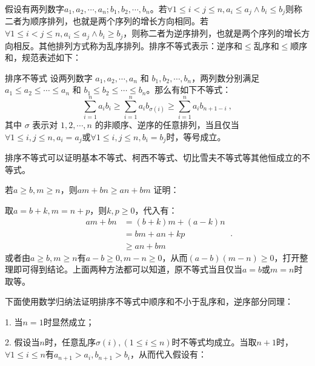假设有两列数字$a_1,a_2,\cdots,a_n;b_1,b_2,\cdots,b_n$。若$\forall 1\leq i<j\leq n,a_i\leq a_j\land b_i\leq b_j$则称二者为顺序排列，也就是两个序列的增长方向相同。若$\forall 1\leq i<j\leq n,a_i\leq a_j\land b_i\geq b_j$，则称二者为逆序排列，也就是两个序列的增长方向相反。其他排列方式称为乱序排列。排序不等式表示：逆序和$\leq$乱序和$\leq$顺序和，规范表述如下：

\begin{theorem}{排序不等式}
设两列数字 $a_1, a_2, \cdots, a_n$ 和 $b_1, b_2, \cdots, b_n$，两列数分别满足 $a_1 \leq a_2 \leq \cdots \leq a_n$ 和 $b_1 \leq b_2 \leq \cdots \leq b_n$。那么有如下不等式：
\begin{equation}
\sum_{i=1}^n a_i b_i \geq \sum_{i=1}^n a_i b_{\sigma(i)} \geq \sum_{i=1}^n a_i b_{n+1-i}~,
\end{equation}
其中 $\sigma$ 表示对 ${1, 2, \cdots, n}$ 的非顺序、逆序的任意排列，当且仅当$\forall 1\leq i,j\leq n,a_i=a_j$或$\forall 1\leq i,j\leq n,b_i=b_j$时，等号成立。
\end{theorem}

排序不等式可以证明基本不等式、柯西不等式、切比雪夫不等式等其他恒成立的不等式。

\begin{lemma}{若$a\geq b,m\geq n$，则$am+bn\geq an+bm$}\label{lem_HsEquN_1}
证明：

取$a=b+k,m=n+p$，则$k,p\geq0$，代入有：
\begin{equation}
\begin{split}
am+bn&= (b+k)m+(a-k)n \\ 
&= bm+an+kp \\
&\geq an+bm
\end{split}~.
\end{equation}
或者由$a\geq b,m\geq n$有$a-b\geq 0,m- n\geq0$，从而$(a-b)(m- n)\geq0$，打开整理即可得到结论。上面两种方法都可以知道，原不等式当且仅当$a=b$或$m=n$时取等。
\end{lemma}

下面使用数学归纳法证明排序不等式中顺序和不小于乱序和，逆序部分同理：

1. 当$n=1$时显然成立；

2. 假设当$n$时，任意乱序$\sigma(i),(1\leq i\leq n)$时不等式均成立。当取$n+1$时，$\forall 1\leq i\leq n$有$a_{n+1}>a_i,b_{n+1}>b_i$，从而代入假设有：

